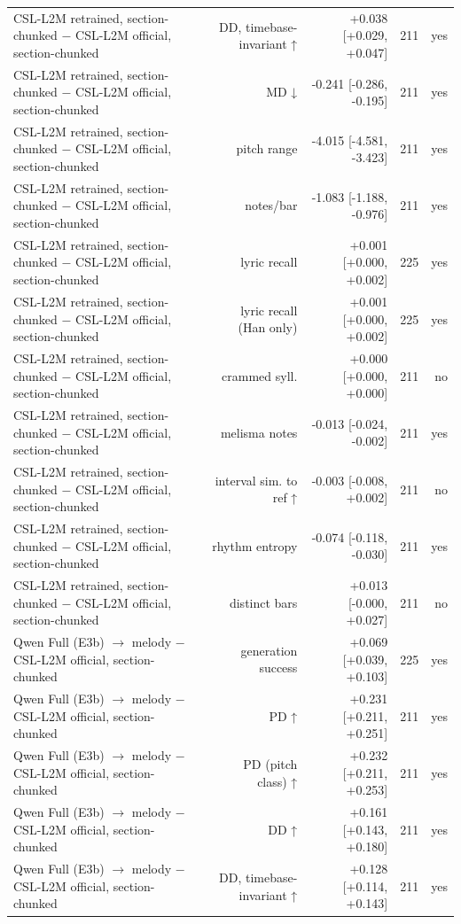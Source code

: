 \begin{table}[t]
\begin{tabular}{lrrrr}
CSL-L2M retrained, section-chunked $-$ CSL-L2M official, section-chunked & DD, timebase-invariant ↑ & +0.038 [+0.029, +0.047] & 211 & yes \\
CSL-L2M retrained, section-chunked $-$ CSL-L2M official, section-chunked & MD ↓ & -0.241 [-0.286, -0.195] & 211 & yes \\
CSL-L2M retrained, section-chunked $-$ CSL-L2M official, section-chunked & pitch range & -4.015 [-4.581, -3.423] & 211 & yes \\
CSL-L2M retrained, section-chunked $-$ CSL-L2M official, section-chunked & notes/bar & -1.083 [-1.188, -0.976] & 211 & yes \\
CSL-L2M retrained, section-chunked $-$ CSL-L2M official, section-chunked & lyric recall & +0.001 [+0.000, +0.002] & 225 & yes \\
CSL-L2M retrained, section-chunked $-$ CSL-L2M official, section-chunked & lyric recall (Han only) & +0.001 [+0.000, +0.002] & 225 & yes \\
CSL-L2M retrained, section-chunked $-$ CSL-L2M official, section-chunked & crammed syll. & +0.000 [+0.000, +0.000] & 211 & no \\
CSL-L2M retrained, section-chunked $-$ CSL-L2M official, section-chunked & melisma notes & -0.013 [-0.024, -0.002] & 211 & yes \\
CSL-L2M retrained, section-chunked $-$ CSL-L2M official, section-chunked & interval sim. to ref ↑ & -0.003 [-0.008, +0.002] & 211 & no \\
CSL-L2M retrained, section-chunked $-$ CSL-L2M official, section-chunked & rhythm entropy & -0.074 [-0.118, -0.030] & 211 & yes \\
CSL-L2M retrained, section-chunked $-$ CSL-L2M official, section-chunked & distinct bars & +0.013 [-0.000, +0.027] & 211 & no \\
Qwen Full (E3b) $\rightarrow$ melody $-$ CSL-L2M official, section-chunked & generation success & +0.069 [+0.039, +0.103] & 225 & yes \\
Qwen Full (E3b) $\rightarrow$ melody $-$ CSL-L2M official, section-chunked & PD ↑ & +0.231 [+0.211, +0.251] & 211 & yes \\
Qwen Full (E3b) $\rightarrow$ melody $-$ CSL-L2M official, section-chunked & PD (pitch class) ↑ & +0.232 [+0.211, +0.253] & 211 & yes \\
Qwen Full (E3b) $\rightarrow$ melody $-$ CSL-L2M official, section-chunked & DD ↑ & +0.161 [+0.143, +0.180] & 211 & yes \\
Qwen Full (E3b) $\rightarrow$ melody $-$ CSL-L2M official, section-chunked & DD, timebase-invariant ↑ & +0.128 [+0.114, +0.143] & 211 & yes \\

\end{tabular}
\end{table}
